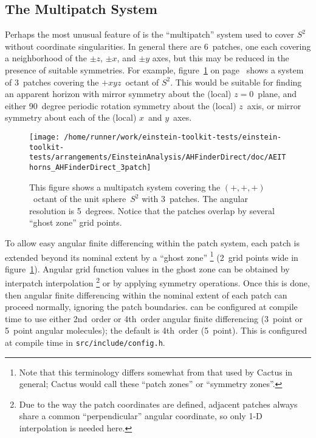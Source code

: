 
\subsection{The Multipatch System}
\label{AHFinderDirect/sect-multipatch-system}

Perhaps the most unusual feature of  is the
``multipatch'' system used to cover $S^2$ without coordinate singularities.
In general there are 6~patches, one each covering a neighborhood of
the $\pm z$, $\pm x$, and $\pm y$ axes, but this may be reduced in
the presence of suitable symmetries.  For example,
figure~\ref{AHFinderDirect/fig-3patch}
on page~\pageref{AHFinderDirect/fig-3patch} shows a system
of 3~patches covering the $+xyz$~octant of $S^2$.  This would be
suitable for finding an apparent horizon with mirror symmetry about
the (local) $z=0$~plane, and either 90~degree periodic rotation symmetry
about the (local) $z$~axis, or mirror symmetry about each of the (local)
$x$~and $y$~axes.

\begin{figure}[htbp]
\begin{center}
\texttt{[image: /home/runner/work/einstein-toolkit-tests/einstein-toolkit-tests/arrangements/EinsteinAnalysis/AHFinderDirect/doc/AEIThorns\_AHFinderDirect\_3patch]}
\end{center}
\caption[Illustration of the Multipatch System]
	{
	This figure shows a multipatch system covering the
	$(+,+,+)$~octant of the unit sphere~$S^2$ with 3~patches.
	The angular resolution is 5~degrees.  Notice that the
	patches overlap by several ``ghost zone'' grid points.
	}
\label{AHFinderDirect/fig-3patch}
\end{figure}

To allow easy angular finite differencing within the patch system,
each patch is extended beyond its nominal extent by a ``ghost zone''%
\footnote{%
	 Note that this terminology differs somewhat
	 from that used by Cactus in general; Cactus
	 would call these ``patch zones'' or ``symmetry
	 zones''.
	 }%
{} (2~grid points wide in figure~\ref{AHFinderDirect/fig-3patch}).
Angular grid function values in the ghost zone can be obtained by
interpatch interpolation%
\footnote{%
	 Due to the way the patch coordinates are defined,
	 adjacent patches always share a common ``perpendicular''
	 angular coordinate, so only 1-D interpolation
	 is needed here.
	 }%
{} or by applying symmetry operations.  Once this is done, then angular
finite differencing within the nominal extent of each patch can proceed
normally, ignoring the patch boundaries.   can
be configured at compile time to use either 2nd~order or 4th~order
angular finite differencing (3~point or 5~point angular molecules);
the default is 4th~order (5~point).  This is configured at compile time
in \verb|src/include/config.h|.

